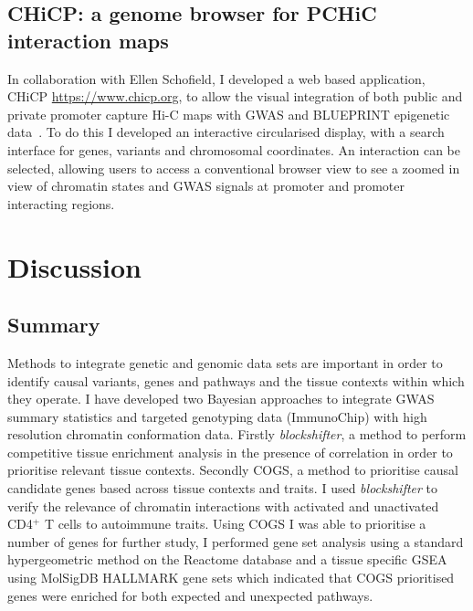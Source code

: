\documentclass[a4paper,11pt]{report}
\begin{document}
\section{CHiCP: a genome browser for PCHiC interaction maps}
In collaboration with Ellen Schofield, I developed a web based application, CHiCP \url{https://www.chicp.org}, to allow the visual integration of both public and private promoter capture Hi-C maps with GWAS and BLUEPRINT epigenetic data~\citep{SchofieldCarverAchuthanEtAl2016}. To do this I developed an interactive circularised display, with a search interface  for genes, variants and chromosomal coordinates. An interaction can be selected, allowing users to access a conventional browser view to see a zoomed in view of chromatin states and GWAS signals at promoter and promoter interacting regions.

\chapter{Discussion}

\section{Summary} %
Methods to integrate genetic and genomic data sets are important in order to identify causal variants, genes and pathways and the tissue contexts within which they operate. I have developed two Bayesian approaches to integrate GWAS summary statistics and targeted genotyping data (ImmunoChip) with high resolution chromatin conformation data. Firstly \textit{blockshifter}, a method to perform competitive tissue enrichment analysis in the presence of correlation in order to prioritise relevant tissue contexts. Secondly COGS, a method to prioritise causal candidate genes based across tissue contexts and traits.  I used \textit{blockshifter} to verify the relevance of chromatin interactions with activated and unactivated CD4$^{+}$ T cells to autoimmune traits. Using COGS I was able to prioritise a number of genes for further study, I performed gene set analysis using a standard hypergeometric method on the Reactome database and a tissue specific GSEA using MolSigDB HALLMARK gene sets which indicated that COGS prioritised genes  were enriched for both expected and unexpected pathways. 
\end{document}
